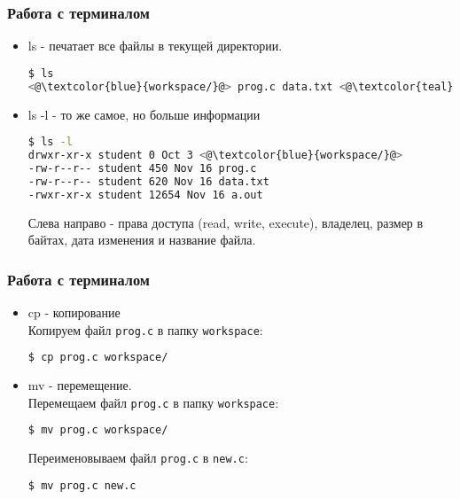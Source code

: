 \documentclass[12pt,pdf,hyperref={unicode}]{beamer}
\begin{document}
\begin{frame}[fragile]
\frametitle{Работа с терминалом}
\begin{itemize}
\item ls - печатает все файлы в текущей директории.
\begin{lstlisting}[language=bash,backgroundcolor=\color{bashcolor}]
$ ls
<@\textcolor{blue}{workspace/}@> prog.c data.txt <@\textcolor{teal}{a.out}@>
\end{lstlisting}
\item ls -l - то же самое, но больше информации
\begin{lstlisting}[language=bash,backgroundcolor=\color{bashcolor}]
$ ls -l
drwxr-xr-x student 0 Oct 3 <@\textcolor{blue}{workspace/}@>
-rw-r--r-- student 450 Nov 16 prog.c
-rw-r--r-- student 620 Nov 16 data.txt
-rwxr-xr-x student 12654 Nov 16 a.out
\end{lstlisting}
Слева направо - права доступа (read, write, execute), владелец, размер в байтах, дата изменения и название файла.
\end{itemize}
\end{frame}

\begin{frame}[fragile]
\frametitle{Работа с терминалом}
\begin{itemize}
\item cp - копирование\\
Копируем файл \texttt{prog.c} в папку \texttt{workspace}:
\begin{lstlisting}[language=bash,backgroundcolor=\color{bashcolor}]
$ cp prog.c workspace/
\end{lstlisting}
\item mv - перемещение.\\
Перемещаем файл \texttt{prog.c} в папку \texttt{workspace}:
\begin{lstlisting}[language=bash,backgroundcolor=\color{bashcolor}]
$ mv prog.c workspace/
\end{lstlisting}
Переименовываем файл \texttt{prog.c} в \texttt{new.c}:
\begin{lstlisting}[language=bash,backgroundcolor=\color{bashcolor}]
$ mv prog.c new.c
\end{lstlisting}
\end{itemize}
\end{frame}
\end{document}
